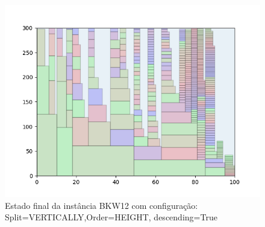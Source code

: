 \begin{figure}[H]
    \centering
    \caption[]{Estado final da instância BKW12 com configuração: Split=VERTICALLY,Order=HEIGHT, descending=True}
    \label{fig:bkw12-vertically-height-true}
    \includegraphics[scale=0.5]{output/figures/bkw/bkw12/vertically/height/true/000}
\end{figure}